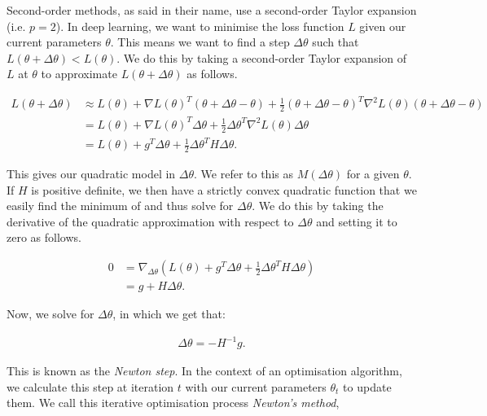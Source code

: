 Second-order methods, as said in their name, use a second-order Taylor expansion (i.e. $p = 2$). In deep learning, we want to minimise the loss function $L$ given our current parameters $\theta$. This means we want to find a step $\Delta \theta$ such that $L(\theta + \Delta \theta) < L(\theta)$. We do this by taking a second-order Taylor expansion of $L$ at $\theta$ to approximate $L(\theta + \Delta \theta)$ as follows.

\begin{align}

    L(\theta + \Delta \theta) &\approx L(\theta) + \nabla L(\theta)^T (\theta + \Delta \theta - \theta) + \frac{1}{2} (\theta + \Delta \theta - \theta)^T \nabla^2 L(\theta) (\theta + \Delta \theta - \theta) \\

    &= L(\theta) + \nabla L(\theta)^T \Delta \theta + \frac{1}{2} \Delta \theta^T \nabla^2 L(\theta) \Delta \theta \\

    &= L(\theta) + g^T \Delta \theta + \frac{1}{2} \Delta \theta^T H \Delta \theta.

\end{align}



This gives our quadratic model in $\Delta \theta$. We refer to this as $M(\Delta \theta)$ for a given $\theta$. If $H$ is positive definite, we then have a strictly convex quadratic function that we easily find the minimum of and thus solve for $\Delta \theta$. We do this by taking the derivative of the quadratic approximation with respect to $\Delta \theta$ and setting it to zero as follows.

\begin{align}

    0 &= \nabla_{\Delta \theta} \left( L(\theta) + g^T \Delta \theta + \frac{1}{2} \Delta \theta^T H \Delta \theta \right) \\

    &= g + H \Delta \theta.

\end{align}

Now, we solve for $\Delta \theta$, in which we get that:

\begin{align}

    \Delta \theta = - H^{-1} g.

\end{align} 

This is known as the \textit{Newton step}. In the context of an optimisation algorithm, we calculate this step at iteration $t$ with our current parameters $\theta_t$ to update them. We call this iterative optimisation process \textit{Newton's method},

